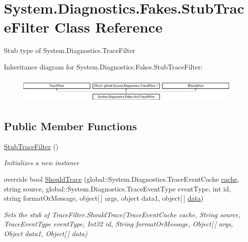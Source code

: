 \hypertarget{class_system_1_1_diagnostics_1_1_fakes_1_1_stub_trace_filter}{\section{System.\-Diagnostics.\-Fakes.\-Stub\-Trace\-Filter Class Reference}
\label{class_system_1_1_diagnostics_1_1_fakes_1_1_stub_trace_filter}
}


Stub type of System.\-Diagnostics.\-Trace\-Filter 


Inheritance diagram for System.\-Diagnostics.\-Fakes.\-Stub\-Trace\-Filter\-:\begin{figure}[H]
\begin{center}
\leavevmode
\includegraphics[height=1.309942cm]{class_system_1_1_diagnostics_1_1_fakes_1_1_stub_trace_filter}
\end{center}
\end{figure}
\subsection*{Public Member Functions}
\begin{DoxyCompactItemize}
\item 
\hyperlink{class_system_1_1_diagnostics_1_1_fakes_1_1_stub_trace_filter_a6fb40417b2f80ecdab62ef9056ec2aeb}{Stub\-Trace\-Filter} ()
\begin{DoxyCompactList}\small\item\em Initializes a new instance\end{DoxyCompactList}\item 
override bool \hyperlink{class_system_1_1_diagnostics_1_1_fakes_1_1_stub_trace_filter_ab3a1b393306914949c37bd856c63199a}{Should\-Trace} (global\-::\-System.\-Diagnostics.\-Trace\-Event\-Cache \hyperlink{jquery-1_810_82-vsdoc_8js_acdb445beb9aa4c6dbdf28258e18dbb58}{cache}, string source, global\-::\-System.\-Diagnostics.\-Trace\-Event\-Type event\-Type, int id, string format\-Or\-Message, object\mbox{[}$\,$\mbox{]} args, object data1, object\mbox{[}$\,$\mbox{]} \hyperlink{jquery-1_810_82-vsdoc_8js_a609407b3456fdc3c5671a9fc4a226ff7}{data})
\begin{DoxyCompactList}\small\item\em Sets the stub of Trace\-Filter.\-Should\-Trace(\-Trace\-Event\-Cache cache, String source, Trace\-Event\-Type event\-Type, Int32 id, String format\-Or\-Message, Object\mbox{[}$\,$\mbox{]} args, Object data1, Object\mbox{[}$\,$\mbox{]} data)\end{DoxyCompactList}\end{DoxyCompactItemize}
